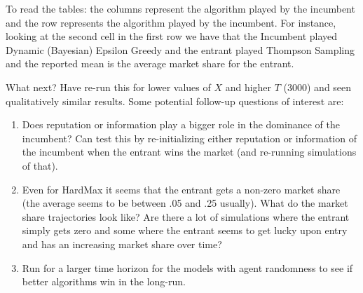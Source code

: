 \documentclass[11pt,letterpaper]{article}
\begin{document}
To read the tables: the columns represent the algorithm played by the incumbent and the row represents the algorithm played by the incumbent. For instance, looking at the second cell in the first row we have that the Incumbent played Dynamic (Bayesian) Epsilon Greedy and the entrant played Thompson Sampling and the reported mean is the average market share for the entrant.



What next? Have re-run this for lower values of $X$ and higher $T$ (3000) and seen qualitatively similar results. Some potential follow-up questions of interest are:
\begin{enumerate}
\item Does reputation or information play a bigger role in the dominance of the incumbent? Can test this by re-initializing either reputation or information of the incumbent when the entrant wins the market (and re-running simulations of that).
\item Even for HardMax it seems that the entrant gets a non-zero market share (the average seems to be between .05 and .25 usually). What do the market share trajectories look like? Are there a lot of simulations where the entrant simply gets zero and some where the entrant seems to get lucky upon entry and has an increasing market share over time?
\item Run for a larger time horizon for the models with agent randomness to see if better algorithms win in the long-run.
\end{enumerate}
\end{document}
